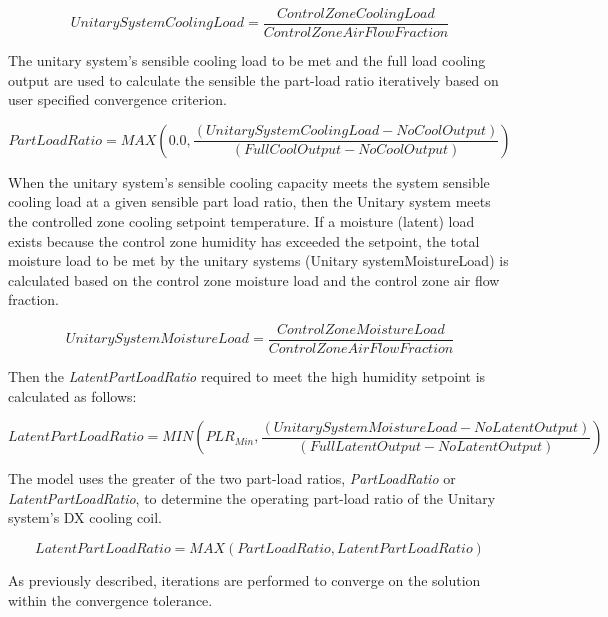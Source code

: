 \begin{equation}
UnitarySystemCoolingLoad = \frac{{ControlZoneCoolingLoad}}{{ControlZoneAirFlowFraction}}
\end{equation}

The unitary system's sensible cooling load to be met and the full load cooling output are used to calculate the sensible the part-load ratio iteratively based on user specified convergence criterion.

\begin{equation}
PartLoadRatio = MAX\left( {0.0,\frac{{\left( {UnitarySystemCoolingLoad - NoCoolOutput} \right)}}{{\left( {FullCoolOutput - NoCoolOutput} \right)}}} \right)
\end{equation}

When the unitary system's sensible cooling capacity meets the system sensible cooling load at a given sensible part load ratio, then the Unitary system meets the controlled zone cooling setpoint temperature. If a moisture (latent) load exists because the control zone humidity has exceeded the setpoint, the total moisture load to be met by the unitary systems (Unitary systemMoistureLoad) is calculated based on the control zone moisture load and the control zone air flow fraction.

\begin{equation}
UnitarySystemMoistureLoad = \frac{{ControlZoneMoistureLoad}}{{ControlZoneAirFlowFraction}}
\end{equation}

Then the \emph{LatentPartLoadRatio} required to meet the high humidity setpoint is calculated as follows:

\begin{equation}
  LatentPartLoadRatio = MIN\left( {PL{R_{Min}},\frac{{\left( {UnitarySystemMoistureLoad - NoLatentOutput} \right)}}{{\left( {FullLatentOutput - NoLatentOutput} \right)}}} \right)
\end{equation}

The model uses the greater of the two part-load ratios, \emph{PartLoadRatio} or \emph{LatentPartLoadRatio}, to determine the operating part-load ratio of the Unitary system's DX cooling coil.

\begin{equation}
LatentPartLoadRatio = MAX\left( {PartLoadRatio,LatentPartLoadRatio} \right)
\end{equation}

As previously described, iterations are performed to converge on the solution within the convergence tolerance.

